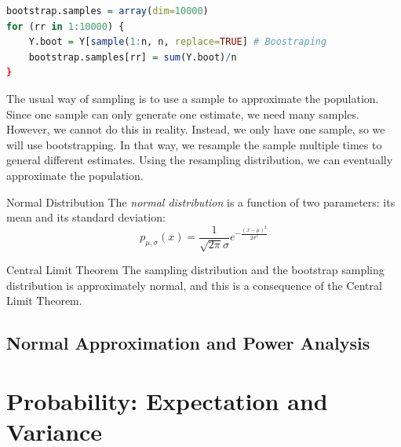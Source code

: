 \begin{lstlisting}[title=Boostraping Sample, language=r]
bootstrap.samples = array(dim=10000)
for (rr in 1:10000) {
	Y.boot = Y[sample(1:n, n, replace=TRUE] # Boostraping
	bootstrap.samples[rr] = sum(Y.boot)/n
}
\end{lstlisting}


\begin{rmk}
	The usual way of sampling is to use a sample to approximate the population. Since one sample can only generate one estimate, we need many samples. However, we cannot do this in reality. Instead, we only have one sample, so we will use bootstrapping. In that way, we resample the sample multiple times to general different estimates. Using the resampling distribution, we can eventually approximate the population. 
\end{rmk}
\begin{df}{Normal Distribution}
	The \textit{normal distribution} is a function of two parameters: its mean and its standard deviation: \[p_{\mu,\sigma}(x)=\dfrac{1}{\sqrt{2\pi}\sigma}e^{-\frac{(x-\mu)^2}{2\sigma^2}}\]
\end{df}
\begin{thm}{Central Limit Theorem}
	The sampling distribution and the bootstrap sampling distribution is approximately normal, and this is a consequence of the Central Limit Theorem. 
\end{thm}

\subsection{Normal Approximation and Power Analysis}

\newpage
\section{Probability: Expectation and Variance}
